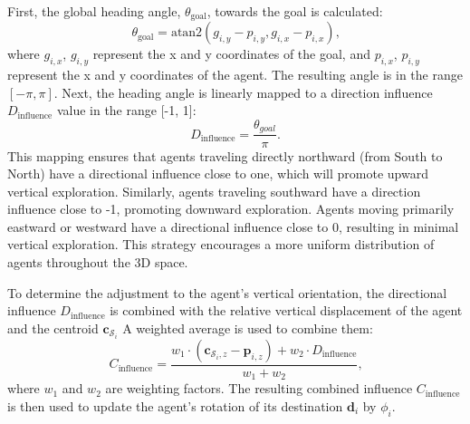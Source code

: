         First, the global heading angle, $\theta_{\text{goal}}$, towards the goal is calculated: 
        \begin{equation}
            \theta_{\text{goal}} = \text{atan2}(g_{i,y} - p_{i,y}, g_{i,x} - p_{i,x})\text{,}
        \end{equation}
        where $g_{i, x}$, $g_{i, y}$ represent the x and y coordinates of the goal, and $p_{i, x}$, $p_{i, y}$ represent the x and y coordinates of the agent.
        The resulting angle is in the range $[-\pi, \pi]$.
        Next, the heading angle is linearly mapped to a direction influence $D_{\text{influence}}$ value in the range [-1, 1]:
        \begin{equation}
            D_{\text{influence}} = \frac{\theta_{goal}}{\pi}\text{.}
        \end{equation}
        This mapping ensures that agents traveling directly northward (from South to North) have a directional influence close to one, which will promote upward vertical exploration. 
        Similarly, agents traveling southward have a direction influence close to -1, promoting downward exploration. 
        Agents moving primarily eastward or westward have a directional influence close to 0, resulting in minimal vertical exploration.
        This strategy encourages a more uniform distribution of agents throughout the 3D space. 

        To determine the adjustment to the agent's vertical orientation, the directional influence $D_{\text{influence}}$ is combined with the relative vertical displacement of the agent and the centroid $\mathbf{c}_{\mathcal{S}_i}$
        A weighted average is used to combine them: 
        \begin{equation}
            \label{eqn:combined_influace}
            C_{\text{influence}} = \frac{w_1 \cdot (\mathbf{c}_{\mathcal{S}_i,z} - \mathbf{p}_{i,z}) + w_2 \cdot D_{\text{influence}}}{w_1 + w_2}\text{,}
        \end{equation} 
        where $w_1$ and $w_2$ are weighting factors. 
        The resulting combined influence $C_{\text{influence}}$ is then used to update the agent's rotation of its destination $\mathbf{d}_i$ by $\phi_i$.

